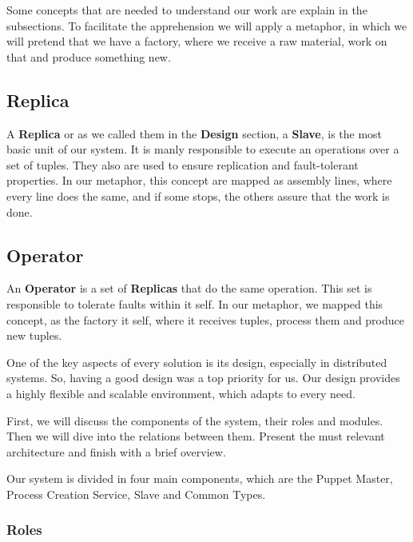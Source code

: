 \documentclass[times, 10pt,twocolumn]{article}
\begin{document}
 Some concepts that are needed to understand our work are explain in the subsections. To facilitate the apprehension we will apply a metaphor, in which we will pretend that we have a factory, where we receive a raw material, work on that and produce something new. 
 
 \subsection{Replica}
 A \textbf{Replica} or as we called them in the \textbf{Design} section, a \textbf{Slave}, is the most basic unit of our system. It is manly responsible to execute an operations over a set of tuples. They also are used to ensure replication and fault-tolerant properties. In our metaphor, this concept are mapped as assembly lines, where every line does the same, and if some stops, the others assure that the work is done.
 
 \subsection{Operator}
 An \textbf{Operator} is a set of \textbf{Replicas} that do the same operation. This set is responsible to tolerate faults within it self. In our metaphor, we mapped this concept, as the factory it self, where it receives tuples, process them and produce new tuples.




One of the key aspects of every solution is its design, especially in distributed systems. So, having a good design was a top priority for us. Our design provides a highly flexible and scalable environment, which adapts to every need.

First, we will discuss the components of the system, their roles and modules. Then we will dive into the relations between them. Present the must relevant architecture and finish with a brief overview.


Our system is divided in four main components, which are the Puppet Master, Process Creation Service, Slave and Common Types.

\subsubsection{Roles}
\end{document}

